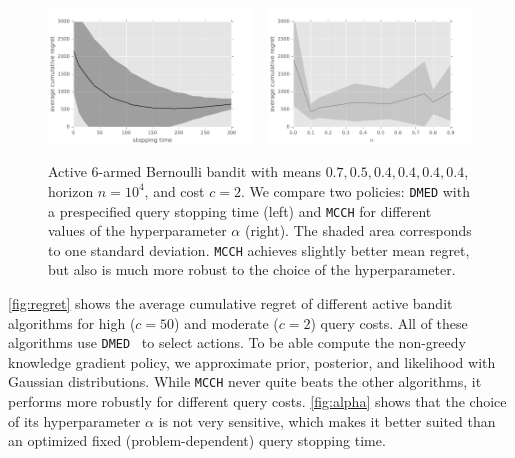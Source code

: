\documentclass{article}
\begin{document}
\begin{figure}[t]
\centering
\includegraphics[width=0.48\textwidth]{query-stop.pdf}%
~
\includegraphics[width=0.48\textwidth]{param-regret.pdf}
\caption{Active 6-armed Bernoulli bandit with means
$0.7, 0.5, 0.4, 0.4, 0.4, 0.4$,
horizon $n = 10^4$, and cost $c = 2$.
We compare two policies:
\texttt{DMED} with a prespecified query stopping time (left)
and \texttt{MCCH}
for different values of the hyperparameter $\alpha$ (right).
The shaded area corresponds to one standard deviation.
\texttt{MCCH} achieves slightly better mean regret,
but also is much more robust to the choice of the hyperparameter.
}
\label{fig:alpha}
\end{figure}

\autoref{fig:regret} shows the average cumulative regret
of different active bandit algorithms for high ($c = 50$) and
moderate ($c = 2$) query costs.
All of these algorithms use \texttt{DMED}~\citep{Honda10}
to select actions.
To be able compute the non-greedy knowledge gradient policy,
we approximate prior, posterior, and likelihood with Gaussian distributions.
While \texttt{MCCH} never quite beats the other algorithms,
it performs more robustly for different query costs.
\autoref{fig:alpha} shows that the choice of its hyperparameter $\alpha$
is not very sensitive,
which makes it better suited than
an optimized fixed (problem-dependent) query stopping time.
\end{document}
